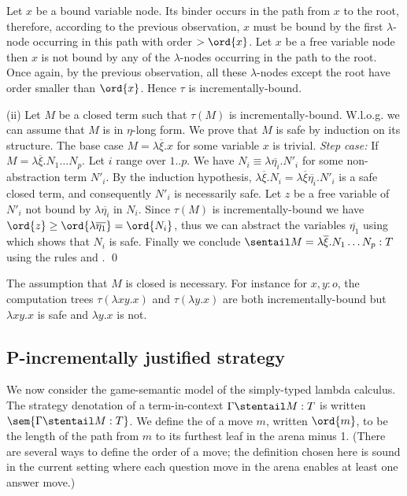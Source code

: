 Let $x$ be a bound variable node. Its binder occurs in the path from
$x$ to the root, therefore, according to the previous observation,
$x$ must be bound by the first $\lambda$-node occurring in this path
with order $>\ord{x}$. Let $x$ be a free variable node then $x$ is
not bound by any of the $\lambda$-nodes occurring in the path to the
root. Once again, by the previous observation, all these
$\lambda$-nodes except the root have order smaller than $\ord{x}$.
Hence $\tau$ is incrementally-bound.

(ii) Let $M$ be a closed term such that $\tau(M)$ is
incrementally-bound.  W.l.o.g. we can assume that $M$ is in $\eta$-long
form.  We prove that $M$ is safe by induction on its structure. The
base case $M = \lambda \overline{\xi} . x$ for some variable $x$ is
trivial.  \emph{Step case:} If $M = \lambda \overline{\xi} . N_1
\ldots N_p$.  Let $i$ range over $1..p$. We have $N_i \equiv \lambda
\overline{\eta_i} . N'_i$ for some non-abstraction term $N'_i$. By
the induction hypothesis, $\lambda \overline{\xi} . N_i = \lambda
\overline{\xi} \overline{\eta_i} . N'_i$ is a safe closed term, and
consequently $N'_i$ is necessarily safe. Let $z$ be a free variable
of $N'_i$ not bound by $\lambda \overline{\eta_i}$ in $N_i$. Since
$\tau(M)$ is incrementally-bound we have $\ord{z} \geq \ord{\lambda
  \overline{\eta_1}} = \ord{N_i}$, thus we can abstract the variables $\overline{\eta_1}$ using  which shows that $N_i$ is safe.  Finally
we conclude $\sentail M = \lambda \overline{\xi} . N_1 \ldots N_p :
T$ using the rules  and .  \qed



The assumption that $M$ is closed is necessary. For instance for
$x,y:o$, the computation trees $\tau(\lambda x y .x)$ and
$\tau(\lambda y . x)$ are both incrementally-bound but $\lambda x y
.x$ is safe and $\lambda y . x$ is not.

\subsection*{P-incrementally justified strategy}

We now consider the game-semantic model of the simply-typed lambda
calculus. The strategy denotation of a term-in-context $\Gamma
\stentail M : T$ is written $\sem{\Gamma
\stentail M : T}$. We define the  of a move $m$,
written $\ord{m}$, to be the length of the path from $m$ to its
furthest leaf in the arena minus 1. (There are several ways to
define the order of a move; the definition chosen here is sound in
the current setting where each question move in the arena enables at
least one answer move.)

